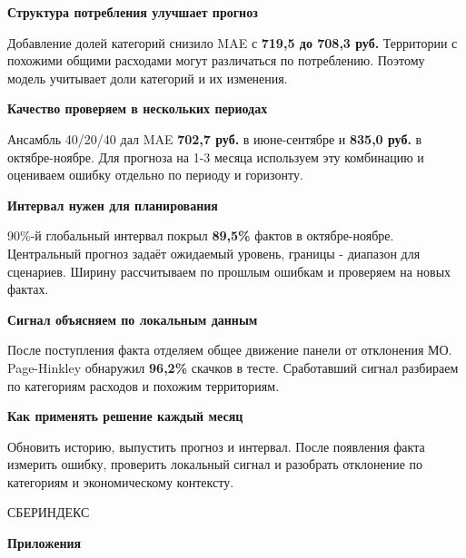\documentclass[12pt,a4paper,landscape]{article}
\newcommand{\PageHead}[2]{{\fontsize{27}{32}\selectfont\bfseries #2\par}}
\newcommand{\Aside}[1]{\par{\fontsize{15}{19}\selectfont\bfseries\color{Green}#1\par}\vspace{2mm}}
\begin{document}
\clearpage\PageHead{Заключение}{Выводы}\par\vspace{7mm}
\begin{minipage}[t]{.47\linewidth}\vspace{0pt}\RaggedRight
\Aside{Структура потребления улучшает прогноз}
Добавление долей категорий снизило MAE с \textbf{719,5 до 708,3 руб.} Территории с похожими общими расходами могут различаться по потреблению. Поэтому модель учитывает доли категорий и их изменения.
\par\vspace{6mm}\Aside{Качество проверяем в нескольких периодах}
Ансамбль 40/20/40 дал MAE \textbf{702,7 руб.} в июне-сентябре и \textbf{835,0 руб.} в октябре-ноябре. Для прогноза на 1-3 месяца используем эту комбинацию и оцениваем ошибку отдельно по периоду и горизонту.
\end{minipage}\hfill
\begin{minipage}[t]{.47\linewidth}\vspace{0pt}\RaggedRight
\Aside{Интервал нужен для планирования}
90\%-й глобальный интервал покрыл \textbf{89,5\%} фактов в октябре-ноябре. Центральный прогноз задаёт ожидаемый уровень, границы - диапазон для сценариев. Ширину рассчитываем по прошлым ошибкам и проверяем на новых фактах.
\par\vspace{6mm}\Aside{Сигнал объясняем по локальным данным}
После поступления факта отделяем общее движение панели от отклонения МО. Page-Hinkley обнаружил \textbf{96,2\%} скачков в тесте. Сработавший сигнал разбираем по категориям расходов и похожим территориям.
\end{minipage}
\par\vspace{9mm}\Aside{Как применять решение каждый месяц}
Обновить историю, выпустить прогноз и интервал. После появления факта измерить ошибку, проверить локальный сигнал и разобрать отклонение по категориям и экономическому контексту.


\clearpage\thispagestyle{empty}\pagecolor{Ink}\color{Paper}
{\fontsize{14}{18}\selectfont СБЕРИНДЕКС}\par
\vspace{39mm}
{\fontsize{42}{49}\selectfont\bfseries Приложения\par}
\end{document}

